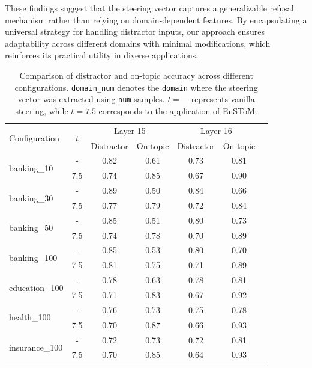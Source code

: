 \documentclass[11pt]{article}
\begin{document}
These findings suggest that the steering vector captures a generalizable refusal mechanism rather than relying on domain-dependent features. By encapsulating a universal strategy for handling distractor inputs, our approach ensures adaptability across different domains with minimal modifications, which reinforces its practical utility in diverse applications.





\begin{table}[t]
\centering
\label{tab:results}
\renewcommand{\arraystretch}{1.0} %
\setlength{\tabcolsep}{2.5pt} %
\footnotesize
\begin{tabular}{@{}lcccccc@{}}
\toprule
\multirow{2}{*}{Configuration} & \multirow{2}{*}{$t$} & \multicolumn{2}{c}{Layer 15} & \multicolumn{2}{c}{Layer 16} \\ 
\cmidrule(lr){3-4} \cmidrule(lr){5-6}
 &  & Distractor & On-topic & Distractor & On-topic \\ 
\midrule
\midrule
\multirow{2}{*}{banking\_10} & -   & 0.82 & 0.61 & 0.73 & 0.81 \\
                              & 7.5 & 0.74 & 0.85 & 0.67 & 0.90 \\ 
\midrule
\multirow{2}{*}{banking\_30}  & -   & 0.89 & 0.50 & 0.84 & 0.66 \\
                              & 7.5 & 0.77 & 0.79 & 0.72 & 0.84 \\ 
\midrule
\multirow{2}{*}{banking\_50}  & -   & 0.85 & 0.51 & 0.80 & 0.73 \\
                              & 7.5 & 0.74 & 0.78 & 0.70 & 0.89 \\ 
\midrule
\multirow{2}{*}{banking\_100}  & -   & 0.85 & 0.53 & 0.80 & 0.70 \\
                              & 7.5 & 0.81 & 0.75 & 0.71 & 0.89 \\ 
\midrule
\midrule
\multirow{2}{*}{education\_100} & -   & 0.78 & 0.63 & 0.78 & 0.81 \\
                               & 7.5 & 0.71 & 0.83 & 0.67 & 0.92 \\ 
\midrule
\multirow{2}{*}{health\_100} & -   & 0.76 & 0.73 & 0.75 & 0.78 \\
                               & 7.5 & 0.70 & 0.87 & 0.66 & 0.93 \\ 
\midrule
\multirow{2}{*}{insurance\_100} & -   & 0.72 & 0.73 & 0.72 & 0.81 \\
                               & 7.5 & 0.70 & 0.85 & 0.64 & 0.93 \\ 
\bottomrule
\end{tabular}
\caption{Comparison of distractor and on-topic accuracy across different configurations. \texttt{domain\_num} denotes the \texttt{domain} where the steering vector was extracted using \texttt{num} samples. \( t = - \) represents vanilla steering, while \( t = 7.5 \) corresponds to the application of EnSToM.}
\label{tab:config}
\end{table}
\end{document}
